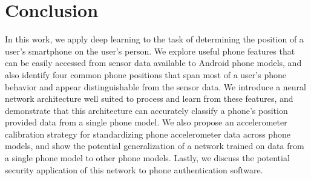 \section{Conclusion}
In this work, we apply deep learning to the task of determining the position of a 
user's smartphone on the user's person. We explore useful phone features that can 
be easily accessed from sensor data available to Android phone models, and also
identify four common phone positions that span most of a user's phone behavior
and appear distinguishable from the sensor data. We introduce a neural network architecture well suited
to process and learn from these features, and demonstrate that this architecture
can accurately classify a phone's position provided data from a single phone model. We also
propose an accelerometer calibration strategy for standardizing phone accelerometer
data across phone models, and show the potential generalization of a network trained on data from a single phone
model to other phone models. Lastly, we discuss the potential security application of this
network to phone authentication software.